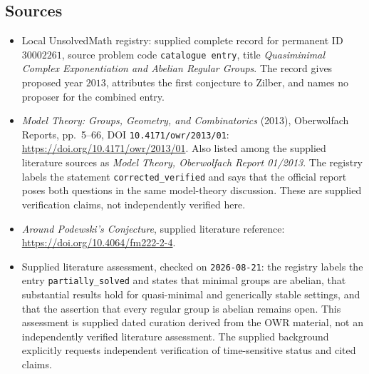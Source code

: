 \documentclass[11pt]{article}
\begin{document}
\subsection{Sources}
\begin{itemize}
\item Local UnsolvedMath registry: supplied complete record for permanent ID \(30002261\), source problem code \texttt{catalogue entry}, title \emph{Quasiminimal Complex Exponentiation and Abelian Regular Groups}. The record gives proposed year \(2013\), attributes the first conjecture to Zilber, and names no proposer for the combined entry.
\item \emph{Model Theory: Groups, Geometry, and Combinatorics} (2013), Oberwolfach Reports, pp.\ 5--66, DOI \texttt{10.4171/owr/2013/01}: \url{https://doi.org/10.4171/owr/2013/01}. Also listed among the supplied literature sources as \emph{Model Theory, Oberwolfach Report 01/2013}. The registry labels the statement \texttt{corrected\_verified} and says that the official report poses both questions in the same model-theory discussion. These are supplied verification claims, not independently verified here.
\item \emph{Around Podewski's Conjecture}, supplied literature reference: \url{https://doi.org/10.4064/fm222-2-4}.
\item Supplied literature assessment, checked on \texttt{2026-08-21}: the registry labels the entry \texttt{partially\_solved} and states that minimal groups are abelian, that substantial results hold for quasi-minimal and generically stable settings, and that the assertion that every regular group is abelian remains open. This assessment is supplied dated curation derived from the OWR material, not an independently verified literature assessment. The supplied background explicitly requests independent verification of time-sensitive status and cited claims.
\end{itemize}
\end{document}

